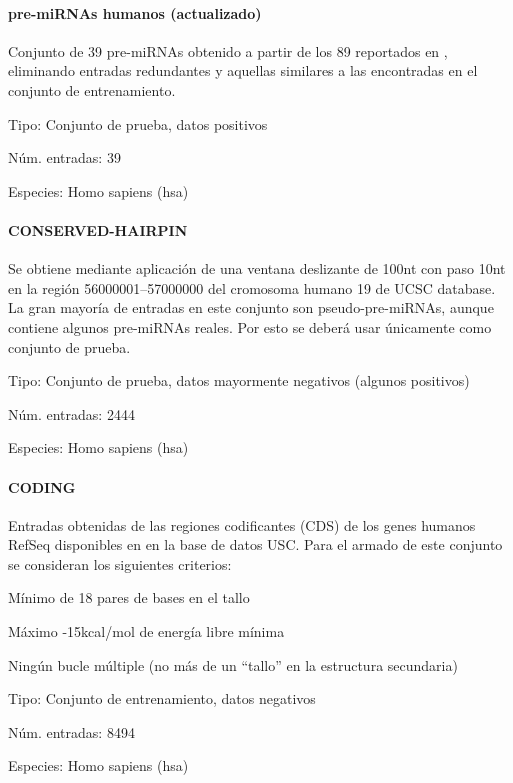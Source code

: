 \documentclass[12pt,bibliography=oldstyle,DIV=12,parskip=half-]{scrartcl}
\begin{document}
\paragraph{pre-miRNAs humanos (actualizado)}
Conjunto de 39 pre-miRNAs obtenido a partir de los 89 reportados en
\cite{bentwich}, eliminando entradas redundantes y aquellas similares
a las encontradas en el conjunto de entrenamiento.
\begin{description*}
\item[Tipo:] Conjunto de prueba, datos positivos
\item[Núm. entradas:] 39
\item[Especies:]  Homo sapiens (hsa)
\end{description*}

\bigskip


\paragraph{CONSERVED-HAIRPIN}
Se obtiene mediante aplicación de una ventana deslizante de 100nt con
paso 10nt en la región 56000001--57000000 del cromosoma humano 19 de
UCSC database. La gran mayoría de entradas en este conjunto son
pseudo-pre-miRNAs, aunque contiene algunos pre-miRNAs reales.  Por
esto se deberá usar únicamente como conjunto de prueba.
\begin{description*}
\item[Tipo:] Conjunto de prueba, datos mayormente negativos (algunos
  positivos)
\item[Núm. entradas:] 2444
\item[Especies:]  Homo sapiens (hsa)
\end{description*}
\paragraph{CODING}
Entradas obtenidas de las regiones codificantes (CDS) de los genes
humanos RefSeq disponibles en en la base de datos USC.  Para
el armado de este conjunto se consideran los siguientes criterios:
\begin{itemize*}
\item Mínimo de 18 pares de bases en el tallo
\item Máximo -15kcal/mol de energía libre mínima
\item Ningún bucle múltiple (no más de un ``tallo'' en la estructura
  secundaria)
\end{itemize*}
\begin{description*}
\item[Tipo:] Conjunto de entrenamiento, datos negativos
\item[Núm. entradas:] 8494
\item[Especies:]  Homo sapiens (hsa)
\end{description*}
%
%
%
%
%
\end{document}
